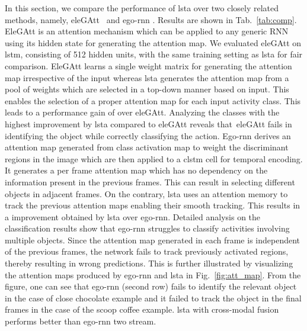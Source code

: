 \documentclass[10pt,twocolumn,letterpaper]{article}
\begin{document}
\begin{matrix*}[r]
In this section, we compare the performance of \ac{lsta} over two closely related methods, namely, eleGAtt~\cite{attention_eccv18} and ego-rnn \cite{sudhakaran2018attention}. Results are shown in Tab.~\ref{tab:comp}. EleGAtt is an attention mechanism which can be applied to any generic RNN using its hidden state for generating the attention map. We evaluated eleGAtt on \ac{lstm}, consisting of 512 hidden units, with the same training setting as \ac{lsta} for fair comparison. EleGAtt learns a single weight matrix for generating the attention map irrespective of the input whereas \ac{lsta} generates the attention map from a pool of weights which are selected in a top-down manner based on input. This enables the selection of a proper attention map for each input activity class. This leads to a performance gain of  over eleGAtt. Analyzing the classes with the highest improvement by \ac{lsta} compared to eleGAtt reveals that~eleGAtt fails in identifying the object while correctly classifying the action. Ego-rnn \cite{sudhakaran2018attention} derives an attention map generated from class activation map to weight the discriminant regions in the image which are then applied to a \ac{clstm} cell for temporal encoding. It generates a per frame attention map which has no dependency on the information present in the previous frames. This can result in selecting different objects in adjacent frames. On the contrary, \ac{lsta} uses an attention memory to track the previous attention maps enabling their smooth tracking. This results in a  improvement obtained by \ac{lsta} over ego-rnn. Detailed analysis on the classification results show that ego-rnn struggles to classify activities involving multiple objects. Since the attention map generated in each frame is independent of the previous frames, the network fails to track previously activated regions, thereby resulting in wrong predictions. This is further illustrated by visualizing the attention maps produced by ego-rnn and \ac{lsta} in Fig.~\ref{fig:att_map}. From the figure, one can see that ego-rnn (second row) fails to identify the relevant object in the case of close chocolate example and it failed to track the object in the final frames in the case of the scoop coffee example. \ac{lsta} with cross-modal fusion performs  better than  ego-rnn two stream. 









\end{matrix*}
\end{document}

